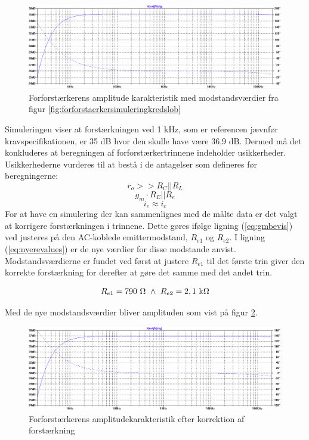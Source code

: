 \begin{figure}[h]
\centering
\includegraphics[width=\textwidth]{teknisk/forforstaerker/amplitudeforforstaerker.png}
\caption{Forforstærkerens amplitude karakteristik med modstandsværdier fra figur \ref{fig:forforstaerkersimuleringkredslob}}
\label{fig:amplitude-forforstaerker}
\end{figure}

Simuleringen viser at forstærkningen ved 1 kHz, som er referencen jævnfør kravspecifikationen, er 35 dB hvor den skulle have være 36,9 dB. Dermed må det konkluderes at beregningen af forforstærkertrinnene indeholder usikkerheder. Usikkerhederne vurderes til at bestå i de antagelser som defineres før beregningerne: 
\[ r_o >>R_C || R_L \]
\[ g_m \cdot R_E||R_e\]
\[i_e \approx i_c\]
For at have en simulering der kan sammenlignes med de målte data er det valgt at korrigere forstærkningen i trinnene. Dette gøres ifølge ligning (\ref{eq:gmbevis}) ved justeres på den AC-koblede emittermodstand, $R_{e1}$ og $R_{e2}$. I ligning (\ref{eq:nyerevalues}) er de nye værdier for disse modstande anvist. Modstandsværdierne er fundet ved først at justere $R_{e1}$ til det første trin giver den korrekte forstærkning for derefter at gøre det samme med det andet trin.

\begin{equation}
R_{e1}=790~\ohm~\wedge ~R_{e2}=2,1~\mathrm{k}\ohm
\label{eq:nyerevalues}
\end{equation}

Med de nye modstandsværdier bliver amplituden som vist på figur \ref{fig:rigtigamplitudeforforstaerker}.

\begin{figure}[h]
\centering
\includegraphics[width=\textwidth]{teknisk/forforstaerker/rigtigamplitude.png}
\caption{Forforstærkerens amplitudekarakteristik efter korrektion af forstærkning}
\label{fig:rigtigamplitudeforforstaerker}
\end{figure}


